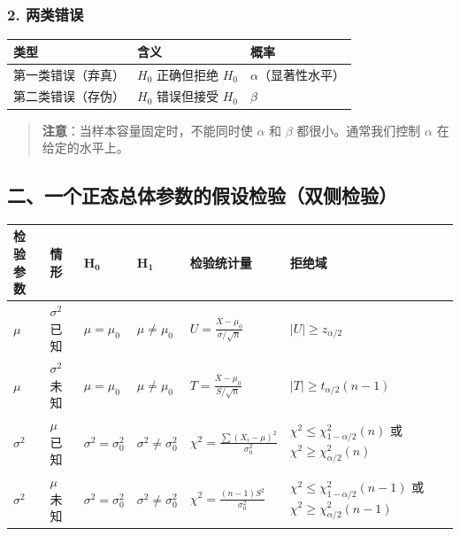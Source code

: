 \documentclass[12pt,a4paper]{ctexart}
\newenvironment{myquote}
  {\par\vspace{0.5em}\begin{quote}\sffamily\color{gray}}
  {\end{quote}\vspace{0.5em}}
\begin{document}
\subsubsection{2. 两类错误}
\begin{center}
    \begin{tabular}{@{}lll@{}}
        \toprule
        \textbf{类型} & \textbf{含义}       & \textbf{概率}     \\
        \midrule
        第一类错误（弃真）   & $H_0$ 正确但拒绝 $H_0$ & $\alpha$（显著性水平） \\
        第二类错误（存伪）   & $H_0$ 错误但接受 $H_0$ & $\beta$         \\
        \bottomrule
    \end{tabular}
\end{center}

\begin{myquote}
    \textbf{注意}：当样本容量固定时，不能同时使 $\alpha$ 和 $\beta$ 都很小。通常我们控制 $\alpha$ 在给定的水平上。
\end{myquote}

\subsection{二、一个正态总体参数的假设检验（双侧检验）}

\begin{center}
    \begin{tabular}{@{}llllll@{}}
        \toprule
        \textbf{检验参数} & \textbf{情形}   & $\mathbf{H_0}$          & $\mathbf{H_1}$            & \textbf{检验统计量}                                   & \textbf{拒绝域}                                                                \\
        \midrule
        $\mu$         & $\sigma^2$ 已知 & $\mu = \mu_0$           & $\mu \ne \mu_0$           & $U = \frac{\bar{X} - \mu_0}{\sigma/\sqrt{n}}$    & $|U| \ge z_{\alpha/2}$                                                      \\
        $\mu$         & $\sigma^2$ 未知 & $\mu = \mu_0$           & $\mu \ne \mu_0$           & $T = \frac{\bar{X} - \mu_0}{S/\sqrt{n}}$         & $|T| \ge t_{\alpha/2}(n-1)$                                                 \\
        $\sigma^2$    & $\mu$ 已知      & $\sigma^2 = \sigma_0^2$ & $\sigma^2 \ne \sigma_0^2$ & $\chi^2 = \frac{\sum (X_i - \mu)^2}{\sigma_0^2}$ & $\chi^2 \le \chi^2_{1-\alpha/2}(n)$ 或 $\chi^2 \ge \chi^2_{\alpha/2}(n)$     \\
        $\sigma^2$    & $\mu$ 未知      & $\sigma^2 = \sigma_0^2$ & $\sigma^2 \ne \sigma_0^2$ & $\chi^2 = \frac{(n-1)S^2}{\sigma_0^2}$           & $\chi^2 \le \chi^2_{1-\alpha/2}(n-1)$ 或 $\chi^2 \ge \chi^2_{\alpha/2}(n-1)$ \\
        \bottomrule
    \end{tabular}
\end{center}
\end{document}
